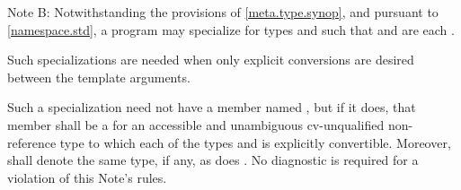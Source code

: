 \pnum
Note B: Notwithstanding the provisions of \ref{meta.type.synop}, and
pursuant to \ref{namespace.std},
a program may specialize 
for types  and  such that
 and
 are each .
\begin{note}
Such specializations are needed when only explicit conversions
are desired between the template arguments.
\end{note}
Such a specialization need not have a member named ,
but if it does, that member shall be a 
for an accessible and unambiguous cv-unqualified non-reference type 
to which each of the types  and  is explicitly convertible.
Moreover,  shall denote
the same type, if any, as does .
No diagnostic is required for a violation of this Note's rules.

